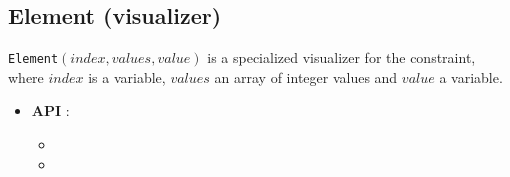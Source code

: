 \subsection{Element (visualizer)}\label{element:visu}\hypertarget{element:visu}{}
\begin{notedef}
  \texttt{Element}$(index, values, value)$ is a specialized visualizer for the  constraint, where $index$ is a variable, $values$ an array of integer values and $value$ a variable.
\end{notedef}

\begin{itemize}
	\item \textbf{API} : 
	\begin{itemize}
	\item {}
	\item {}
	\end{itemize}
\end{itemize}

%

